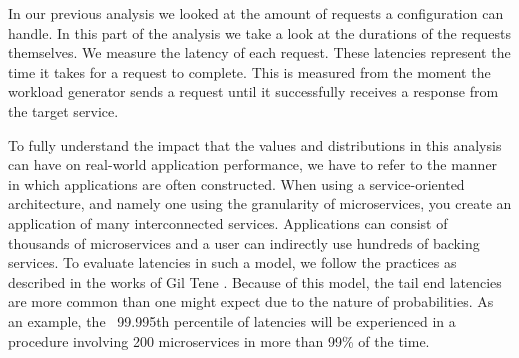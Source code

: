 In our previous analysis we looked at the amount of requests a configuration can handle. In this part of the analysis we take a look at the durations of the requests themselves. We measure the latency of each request. These latencies represent the time it takes for a request to complete. This is measured from the moment the workload generator sends a request until it successfully receives a response from the target service.

To fully understand the impact that the values and distributions in this analysis can have on real-world application performance, we have to refer to the manner in which applications are often constructed. When using a service-oriented architecture, and namely one using the granularity of microservices, you create an application of many interconnected services. Applications can consist of thousands of microservices \cite{design-example-microservices, netflix-microservices-cost} and a user can indirectly use hundreds of backing services. To evaluate latencies in such a model, we follow the practices as described in the works of Gil Tene \cite{Tene2015-measure-latency}. Because of this model, the tail end latencies are more common than one might expect due to the nature of probabilities. As an example, the ~99.995th percentile of latencies will be experienced in a procedure involving 200 microservices in more than 99\% of the time. 


